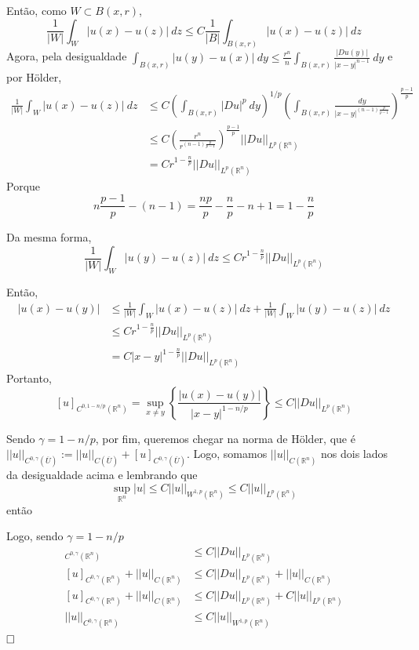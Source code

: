 \documentclass[11pt]{article}
\newcommand{\qed}{$\hfill\square$}
\newcommand{\Rn}{{\mathbb{R}^n}}
\newcommand{\rn}{{\mathbb{R}^n}}
\begin{document}
Então, como $W \subset B(x,r)$, \[ \frac{1}{|W|} \int_W |u(x) - u(z)| \ dz \leq C \frac{1}{|B|} \int_{B(x,r)} |u(x) - u(z)|\ dz \] Agora, pela desigualdade $ \int_{ B(x,r)} | u(y) - u(x) |\ dy \leq \frac{r^n}{n} \int_{B(x,r)} \frac{|Du(y)|}{|x-y|^{n-1}}\ dy  $ e por Hölder, \begin{align*}
	 \frac{1}{|W|} \int_W |u(x) - u(z)| \ dz &\leq C \left(\int_{B(x,r)} |Du|^p \ dy \right)^{1/p}      \left(  \int_{B(x,r)} \frac{dy}{|x-y|^{(n-1)\frac{p}{p-1}}}  \right)^{\frac{p-1}{p}} \\
	 &\leq C \left( \frac{r^n}{r^{(n-1)\frac{p}{p-1}}}\right)^{\frac{p-1}{p}} ||Du||_{L^p(\rn)} \\
	 &= Cr^{1-\frac{n}{p}} ||Du||_{L^p(\rn)}
\end{align*} Porque \[ n\frac{p-1}{p} - (n-1) = \frac{np}{p} - \frac{n}{p} -n + 1 = 1 - \frac{n}{p}\]

Da mesma forma, \[ \frac{1}{|W|} \int_W |u(y) - u(z)| \ dz \leq C r^{1-\frac{n}{p}} ||Du||_{L^p(\rn)} \]

Então, \begin{align*}
	|u(x) - u(y)| &\leq \frac{1}{|W|}\int_W |u(x) -u(z)|\ dz + \frac{1}{|W|} \int_W |u(y) - u(z)| \ dz \\
	&\leq Cr^{1-\frac{n}{p}} ||Du||_{L^p(\rn)}\\
	&= C|x-y|^{1-\frac{n}{p}} ||Du||_{L^p(\rn)}
\end{align*} Portanto, \[ [u]_{C^{0, 1-n/p}(\rn)} = \sup_{x\neq y} \left\{ \frac{|u(x) - u(y)|}{|x-y|^{1-n/p}}\right\}   \leq C   ||Du||_{L^p(\rn)}    \]

Sendo $\gamma = 1 - n/p$, por fim, queremos chegar na norma de Hölder, que é $ ||u||_{C^{0,\gamma}(\overline{U})} := ||u||_{C(\overline{U})} + [u]_{C^{0,\gamma}(\overline{U})}  $. Logo, somamos $||u||_{C(\Rn)}$ nos dois lados da desigualdade acima e lembrando que \[ \sup_{\rn} |u| \leq C ||u||_{W^{1,p}(\rn)} \leq C ||u||_{L^p(\rn)}\] então

Logo, sendo $\gamma = 1 - n/p$ \begin{align*}
	[u]_{C^{0,\gamma}(\rn)}&\leq C ||Du||_{L^p(\rn)}  \\
	[u]_{C^{0,\gamma}(\rn)} + ||u||_{C(\rn)} &\leq C ||Du||_{L^p(\rn)} + ||u||_{C(\rn)} \\
	[u]_{C^{0,\gamma}(\rn)} + ||u||_{C(\rn)} &\leq C ||Du||_{L^p(\rn)} + C||u||_{L^p(\rn)} \\
	||u||_{C^{0,\gamma}(\rn)} & \leq C ||u||_{W^{1,p}(\rn)}
\end{align*}\qed
\end{document}
